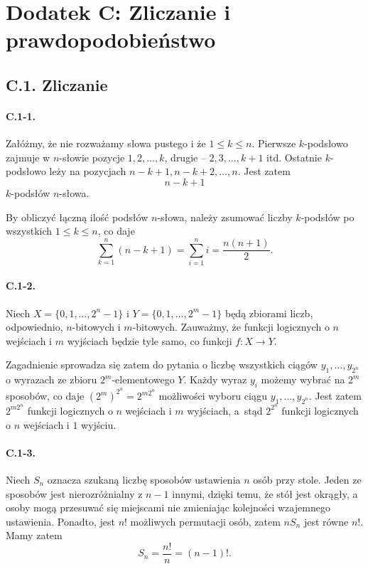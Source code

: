 \section*{Dodatek C: Zliczanie i prawdopodobieństwo}

\subsection*{C.1. Zliczanie}

\paragraph{C.1-1.}
Załóżmy, że nie rozważamy słowa pustego i że $1\le k\le n$. Pierwsze \mbox{$k$-podsłowo} zajmuje w $n$-słowie pozycje $1,2,\dots,k$, drugie -- $2,3,\dots,k+1$ itd. Ostatnie $k$-podsłowo leży na pozycjach $n-k+1,n-k+2,\dots,n$. Jest zatem
\[
	n-k+1
\]
$k$-podsłów $n$-słowa.

By obliczyć łączną ilość podsłów $n$-słowa, należy zsumować liczby \mbox{$k$-podsłów} po wszystkich $1\le k\le n$, co daje
\[
	\sum_{k=1}^n(n-k+1) = \sum_{i=1}^ni = \frac{n(n+1)}{2}.
\]

\paragraph{C.1-2.}
Niech $X=\{ 0,1,\dots,2^n-1\}$ i $Y=\{ 0,1,\dots,2^m-1\}$ będą zbiorami liczb, odpowiednio, $n$-bitowych i $m$-bitowych. Zauważmy, że funkcji logicznych o $n$ wejściach i $m$ wyjściach będzie tyle samo, co funkcji $f\!:X\rightarrow Y$.

Zagadnienie sprowadza się zatem do pytania o liczbę wszystkich ciągów $y_1,\dots,y_{2^n}$ o wyrazach ze zbioru $2^m$-elementowego $Y$. Każdy wyraz $y_i$ możemy wybrać na $2^m$ sposobów, co daje $(2^m)^{2^n} = 2^{m2^n}$ możliwości wyboru ciągu $y_1,\dots,y_{2^n}$. Jest zatem $2^{m2^n}$ funkcji logicznych o $n$ wejściach i $m$ wyjściach, a~stąd $2^{2^n}$ funkcji logicznych o $n$ wejściach i $1$ wyjściu.

\paragraph{C.1-3.}
Niech $S_n$ oznacza szukaną liczbę sposobów ustawienia $n$ osób przy stole. Jeden ze sposobów jest nierozróżnialny z $n-1$ innymi, dzięki temu, że stół jest okrągły, a osoby mogą przesuwać się miejscami nie zmieniając kolejności wzajemnego ustawienia. Ponadto, jest $n!$ możliwych permutacji osób, zatem $nS_n$ jest równe $n!$. Mamy zatem
\[
	S_n = \frac{n!}{n} = (n-1)!.
\]

